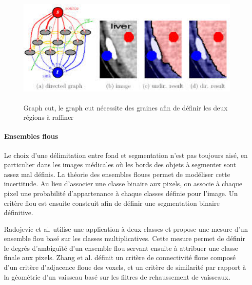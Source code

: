 \begin{figure}
  \centering
  \includegraphics[height=5cm]{Images/graph_cut.jpeg}
  \label{fig:Graph cut}
  \caption{Graph cut, le graph cut nécessite des graines afin de définir les deux régions à raffiner}
\end{figure}

\paragraph{Ensembles flous}

Le choix d'une délimitation entre fond et segmentation n'est pas toujours aisé, en particulier dans les images médicales où les bords des objets à segmenter sont assez mal définis. La théorie des ensembles floues permet de modéliser cette incertitude. Au lieu d'associer une classe binaire aux pixels, on associe à chaque pixel une probabilité d'appartenance à chaque classes définie pour l'image. Un critère flou est ensuite construit afin de définir une segmentation binaire définitive.

Radojevic et al.\cite{Radojevic2015_fuzzy_logic} utilise une application à deux classes et propose une mesure d'un ensemble flou basé sur les classes multiplicatives. Cette mesure permet de définir le degrés d'ambiguïté d'un ensemble flou servant ensuite à attribuer une classe finale aux pixels.
Zhang et al. \cite{Zhang2018_liver_fuzzy_connectedness} définit un critère de connectivité floue composé d'un critère d'adjacence floue des voxels, et un critère de similarité par rapport à la géométrie d'un vaisseau basé sur les filtres de rehaussement de vaisseaux.  


